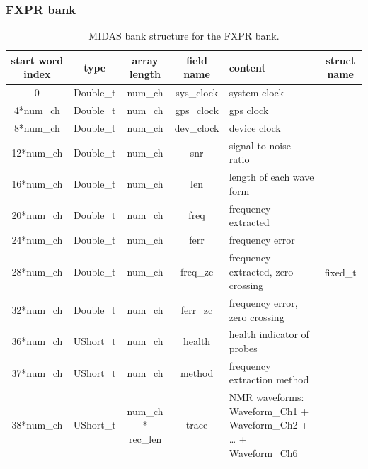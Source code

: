 \subsubsection*{FXPR bank}

\begin{table}[htbp]
\centering
\caption{MIDAS bank structure for the FXPR bank.}
\begin{tabular}{|c|c|c|c|p{4cm}|c|}
\hline
start word index & type      & array length       & field name & content                                                          & struct name \\
\hline
0                & Double\_t & num\_ch            & sys\_clock & system clock                                                     & \multirow{12}{*}{fixed\_t}                  \\
\cline{1-5}
4*num\_ch        & Double\_t & num\_ch            & gps\_clock & gps clock                                                        &                             \\
\cline{1-5}
8*num\_ch        & Double\_t & num\_ch            & dev\_clock & device clock                                                     &                             \\
\cline{1-5}
12*num\_ch       & Double\_t & num\_ch            & snr        & signal to noise ratio                                            &                             \\
\cline{1-5}
16*num\_ch       & Double\_t & num\_ch            & len        & length of each wave form                                         &                             \\
\cline{1-5}
20*num\_ch       & Double\_t & num\_ch            & freq       & frequency extracted                                              &                             \\
\cline{1-5}
24*num\_ch       & Double\_t & num\_ch            & ferr       & frequency error                                                  &                             \\
\cline{1-5}
28*num\_ch       & Double\_t & num\_ch            & freq\_zc   & frequency extracted, zero crossing                               &                             \\
\cline{1-5}
32*num\_ch       & Double\_t & num\_ch            & ferr\_zc   & frequency error, zero crossing                                   &                             \\
\cline{1-5}
36*num\_ch       & UShort\_t & num\_ch            & health     & health indicator of probes                                       &                             \\
\cline{1-5}
37*num\_ch       & UShort\_t & num\_ch            & method     & frequency extraction method                                      &                             \\
\cline{1-5}
38*num\_ch       & UShort\_t & num\_ch * rec\_len & trace      & NMR waveforms: Waveform\_Ch1 + Waveform\_Ch2 + … + Waveform\_Ch6 &     \\    
\hline
\end{tabular} 
\label{tab:fxprtable}
\end{table}

